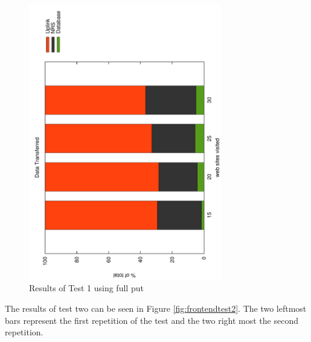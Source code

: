 \begin{figure}
	\centering
		\includegraphics[width=0.75\textwidth, angle=-90]{./img/plots.pdf}
    	\caption{Results of Test 1 using full put}
	\label{fig:frontendtest1}
\end{figure}

The results of test two can be seen in Figure \ref{fig:frontendtest2}. The two leftmost bars represent the first repetition of the test and the two right most the second repetition.

